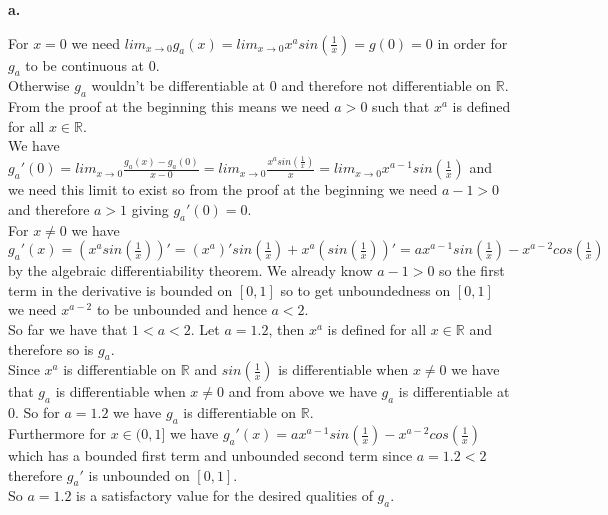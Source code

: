 \documentclass{article}
\begin{document}
{\Large\textbf{a.}}
\begin{center}
    \doublespacing
    For $x = 0$ we need $lim_{x\rightarrow 0} g_a (x) = lim_{x\rightarrow 0} x^a sin(\frac{1}{x}) = g(0) = 0$ in order for $g_a$ to be continuous at 0.
    \\Otherwise $g_a$ wouldn't be differentiable at 0 and therefore not differentiable on $\mathbb{R}$.
    \\From the proof at the beginning this means we need $a > 0$ such that $x^a$ is defined for all $x\in\mathbb{R}$.
    \\We have $g_a '(0) = lim_{x\rightarrow 0}\frac{g_a (x) - g_a (0)}{x - 0} = lim_{x\rightarrow 0}\frac{x^a sin(\frac{1}{x})}{x} = lim_{x\rightarrow 0} x^{a-1} sin(\frac{1}{x})$ and we need this limit to exist so from the proof at the beginning we need $a - 1> 0$ and therefore $a > 1$ giving $g_a '(0) = 0$.
    \\For $x\neq 0$ we have $g_a '(x) = (x^a sin(\frac{1}{x}))' = (x^a)' sin(\frac{1}{x}) + x^a (sin(\frac{1}{x}))' = a x^{a-1} sin(\frac{1}{x}) - x^{a-2} cos(\frac{1}{x})$ by the algebraic differentiability theorem. We already know $a - 1 > 0$ so the first term in the derivative is bounded on $[0, 1]$ so to get unboundedness on $[0, 1]$ we need $x^{a-2}$ to be unbounded and hence $a < 2$.
    \\So far we have that $1 < a < 2$. Let $a = 1.2$, then $x^a$ is defined for all $x\in\mathbb{R}$ and therefore so is $g_a$.
    \\Since $x^a$ is differentiable on $\mathbb{R}$ and $sin(\frac{1}{x})$ is differentiable when $x\neq 0$ we have that $g_a$ is differentiable when $x\neq 0$ and from above we have $g_a$ is differentiable at 0. So for $a = 1.2$ we have $g_a$ is differentiable on $\mathbb{R}$.
    \\Furthermore for $x\in (0, 1]$ we have $g_a '(x) = a x^{a-1} sin(\frac{1}{x}) - x^{a-2} cos(\frac{1}{x})$ which has a bounded first term and unbounded second term since $a = 1.2 < 2$ therefore $g_a '$ is unbounded on $[0, 1]$.
    \\So $a = 1.2$ is a satisfactory value for the desired qualities of $g_a$.
\end{center}
\end{document}

